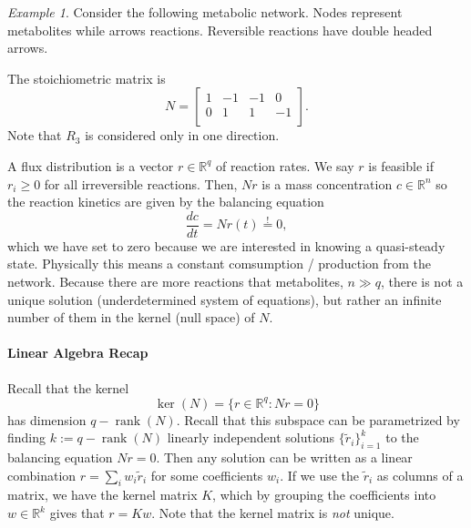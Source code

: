 \documentclass[a4paper]{article}
\DeclareMathOperator{\rank}{rank}
\theoremstyle{plain}
\theoremstyle{definition}
\theoremstyle{remark}
\newtheorem*{example}{Example}
\begin{document}
\begin{example} Consider the following metabolic network. Nodes represent
  metabolites while arrows reactions. Reversible reactions have double headed
  arrows.
  \begin{center}
  \end{center}
  The stoichiometric matrix is
  \[
    N = \begin{bmatrix}
      1 & -1 & -1 &  0 \\
      0 &  1 &  1 & -1 \\
    \end{bmatrix}.
  \]
  Note that $R_3$ is considered only in one direction.
\end{example}

A flux distribution is a vector $r \in \mathbb{R}^q$ of reaction rates. We say
$r$ is feasible if $r_i \geq 0$ for all irreversible reactions. Then, $Nr$ is
a mass concentration $c \in \mathbb{R}^n$ so the reaction kinetics are given
by the balancing equation
\[
  \frac{dc}{dt} = N r(t) \stackrel{!}{=} 0,
\]
which we have set to zero because we are interested in knowing a quasi-steady
state. Physically this means a constant comsumption / production from the
network. Because there are more reactions that metabolites, $n \gg q$, there
is not a unique solution (underdetermined system of equations), but rather an
infinite number of them in the kernel (null space) of $N$. 

\paragraph{Linear Algebra Recap} Recall that the kernel
\[
  \ker(N) = \{ r \in \mathbb{R}^q : Nr = 0 \}
\]
has dimension $q - \rank(N)$. Recall that this subspace can be parametrized by
finding $k := q - \rank(N)$ linearly independent solutions
$\{\tilde{r}_i\}_{i=1}^k$ to the balancing equation $Nr = 0$. Then any
solution can be written as a linear combination $r = \sum_i w_i \tilde{r}_i$
for some coefficients $w_i$. If we use the $\tilde{r}_i$ as columns of a
matrix, we have the kernel matrix $K$, which by grouping the coefficients into
$w \in \mathbb{R}^k$ gives that $r = Kw$. Note that the kernel matrix is
\emph{not} unique.
\end{document}
